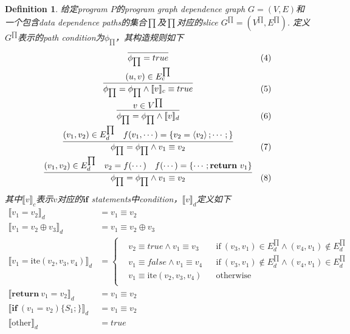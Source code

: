 \documentclass{article}
\newtheorem{definition}[theorem]{Definition}
\newcommand{\abracket}[1]{\ensuremath{\left< #1 \right>}}
\begin{document}
\begin{definition}
\rm 给定program $P$的program graph dependence graph $G=(V,E)$和一个包含data dependence paths的集合$\prod$及$\prod$对应的slice $G^{\prod} = (V^{\prod},E^{\prod})$. 定义$G^{\prod}$表示的path condition为$\phi_{\prod}$，其构造规则如下
$$
\begin{array}{cl}
\infer{\phi_{\prod}=true}{&&&&} & (4)\\[0.5em]
\infer{\phi_{\prod}=\phi_{\prod}\wedge \llbracket v \rrbracket_c \equiv true}{(u,v) \in E_c^{\prod}} & (5) \\[0.5em] 
\infer{\phi_{\prod}=\phi_{\prod}\wedge \llbracket v \rrbracket_d}{v \in V^{\prod}} & (6) \\[0.5em]
\infer{\phi_{\prod}=\phi_{\prod}\wedge v_1 \equiv v_2}{(v_1,v_2) \in E_d^{\prod} & f(v_1,\cdots) = \{v_2 = \abracket{v_2}; \cdots;\}} & (7) \\[0.5em]
\infer{\phi_{\prod}=\phi_{\prod}\wedge v_1 \equiv v_2}{(v_1,v_2) \in E_d^{\prod} & v_2 = f(\cdots) & f(\cdots) = \{\cdots;\textbf{return}~v_1\}}  & (8) \\[0.5em]
\end{array}
$$
其中$\llbracket v \rrbracket_c$表示$v$对应的$\textbf{if}$ statements中condition，$\llbracket v \rrbracket_d$定义如下
$$
\begin{array}{rl}
\llbracket v_1 = v_2 \rrbracket_d &= v_1 \equiv v_2 \\
\llbracket v_1 = v_2 \oplus v_3 \rrbracket_d &= v_1 \equiv v_2 \oplus v_3\\
\llbracket v_1 = \text{ite}(v_2,v_3,v_4) \rrbracket_d & = \left\{\begin{aligned}
&v_2 \equiv true \wedge v_1 \equiv v_3 && \text{if}~(v_3,v_1) \in E_d^{\prod} \wedge (v_4,v_1) \notin E_d^{\prod} \\
&v_1 \equiv false \wedge v_1 \equiv v_4 && \text{if}~(v_3,v_1) \notin E_d^{\prod} \wedge (v_4,v_1) \in E_d^{\prod} \\
&v_1 \equiv \text{ite}(v_2,v_3,v_4) && \text{otherwise} \\
\end{aligned}\right. \\
\llbracket \textbf{return}~v_1 = v_2 \rrbracket_d &= v_1 \equiv v_2 \\
\llbracket \textbf{if}~(v_1 = v_2)\{S_1;\} \rrbracket_d &= v_1 \equiv v_2 \\
\llbracket \text{other} \rrbracket_d &= true

\end{array}
$$
\end{definition}
\end{document}
